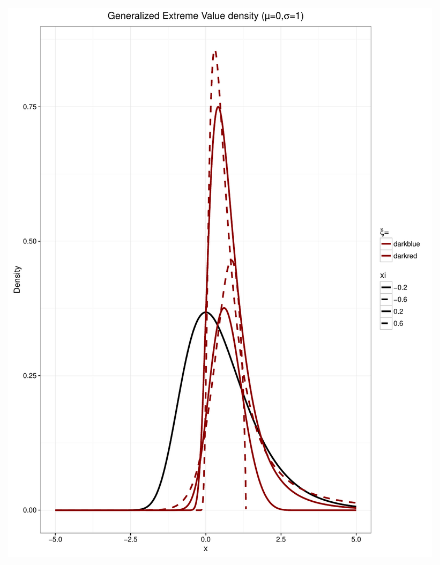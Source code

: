\documentclass[11pt,a4paper,openany ]{book}
\begin{document}
\iffalse
\begin{figure}[!h]
	\minipage{\textwidth}
	\includegraphics[width=\linewidth]{GEVV.pdf}
	\caption{ }\label{mcacls}
	\endminipage
\end{figure}
\end{document}
